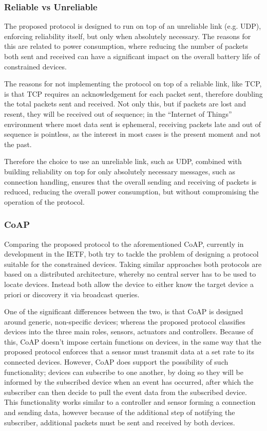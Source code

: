 

\subsubsection{Reliable vs Unreliable} %
\label{ssub:reliable_vs_unreliable}
The proposed protocol is designed to run on top of an unreliable link (e.g. UDP), enforcing reliability itself, but only when absolutely necessary. The reasons for this are related to power consumption, where reducing the number of packets both sent and received can have a significant impact on the overall battery life of constrained devices. 

The reasons for not implementing the protocol on top of a reliable link, like TCP, is that TCP requires an acknowledgement for each packet sent, therefore doubling the total packets sent and received. Not only this, but if packets are lost and resent, they will be received out of sequence; in the ``Internet of Things'' environment where most data sent is ephemeral, receiving packets late and out of sequence is pointless, as the interest in most cases is the present moment and not the past. 

Therefore the choice to use an unreliable link, such as UDP, combined with building reliability on top for only absolutely necessary messages, such as connection handling, ensures that the overall sending and receiving of packets is reduced, reducing the overall power consumption, but without compromising the operation of the protocol.


\subsubsection{CoAP} %
\label{ssub:coap}
Comparing the proposed protocol to the aforementioned CoAP, currently in development in the IETF, both try to tackle the problem of designing a protocol suitable for the constrained devices. Taking similar approaches both protocols are based on a distributed architecture, whereby no central server has to be used to locate devices. Instead both allow the device to either know the target device a priori or discovery it via broadcast queries. 

One of the significant differences between the two, is that CoAP is designed around generic, non-specific devices; whereas the proposed protocol classifies devices into the three main roles, sensors, actuators and controllers. Because of this, CoAP doesn't impose certain functions on devices, in the same way that the proposed protocol enforces that a sensor must transmit data at a set rate to its connected devices. However, CoAP does support the possibility of such functionality; devices can subscribe to one another, by doing so they will be informed by the subscribed device when an event has occurred, after which the subscriber can then decide to pull the event data from the subscribed device. This functionality works similar to a controller and sensor forming a connection and sending data, however because of the additional step of notifying the subscriber, additional packets must be sent and received by both devices. 


